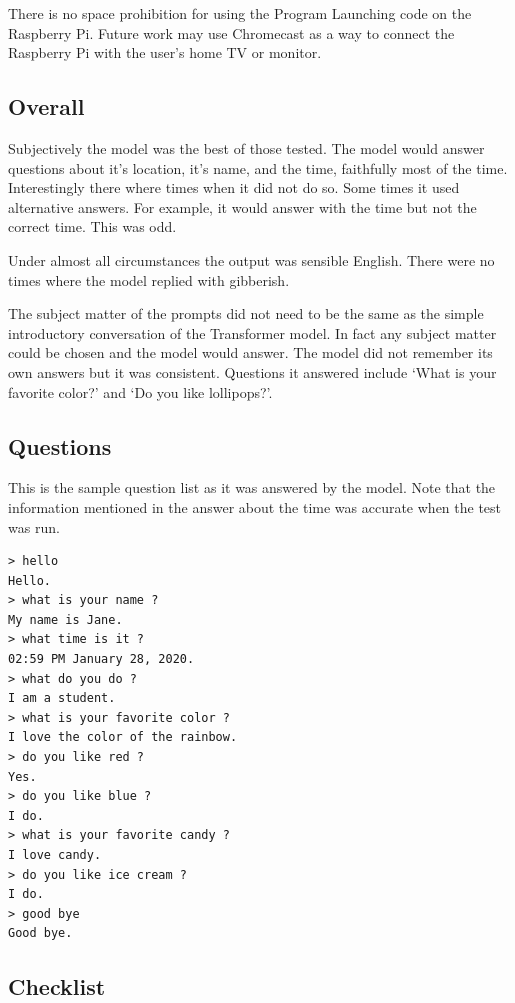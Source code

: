 There is no space prohibition for using the Program Launching code on the Raspberry Pi. Future work may use Chromecast as a way to connect the Raspberry Pi with the user's home TV or monitor. 

\subsection{Overall}

Subjectively the model was the best of those tested. The model would answer questions about it's location, it's name, and the time, faithfully most of the time. Interestingly there where times when it did not do so. Some times it used alternative answers. For example, it would answer with the time but not the correct time. This was odd.

Under almost all circumstances the output was sensible English. There were no times where the model replied with gibberish. 

The subject matter of the prompts did not need to be the same as the simple introductory conversation of the Transformer model. In fact any subject matter could be chosen and the model would answer. The model did not remember its own answers but it was consistent. Questions it answered include `What is your favorite color?' and `Do you like lollipops?'. 

\subsection{Questions}
This is the sample question list as it was answered by the model. Note that the information mentioned in the answer about the time was accurate when the test was run.

\begin{verbatim}
> hello
Hello.
> what is your name ?
My name is Jane.
> what time is it ?
02:59 PM January 28, 2020.
> what do you do ?
I am a student.
> what is your favorite color ?
I love the color of the rainbow.
> do you like red ?
Yes.
> do you like blue ?
I do.
> what is your favorite candy ?
I love candy.
> do you like ice cream ?
I do. 
> good bye
Good bye.
\end{verbatim}

\subsection{Checklist}

